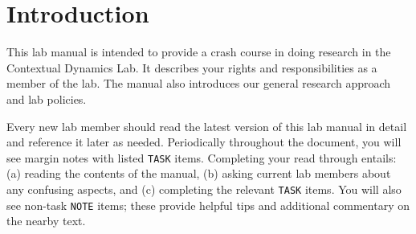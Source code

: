 \documentclass{tufte-book} %
\begin{document}






\newcommand{\director}{Jeremy}
\newcommand{\coordinator}{Paxton}
\newcommand{\labmeetingtime}{Tuesdays at 12:00pm}

\cleardoublepage
\chapter{Introduction}\label{ch:intro} %
This lab manual is intended to provide a crash course in doing
research in the Contextual Dynamics Lab.  It describes your rights and
responsibilities as a member of the lab.  The manual also introduces
our general research approach and lab policies.


\noindent {}
Every new lab member should read
the latest version of this lab manual in detail and reference it later
as needed.  Periodically throughout the document, you will see margin
notes with listed \texttt{TASK} items.  Completing your read through
entails: (a) reading the contents of the manual, (b) asking current
lab members about any confusing aspects, and (c) completing the
relevant \texttt{TASK} items.  You will also see non-task
\texttt{NOTE} items; these provide helpful tips and additional
commentary on the nearby text.
\end{document}
